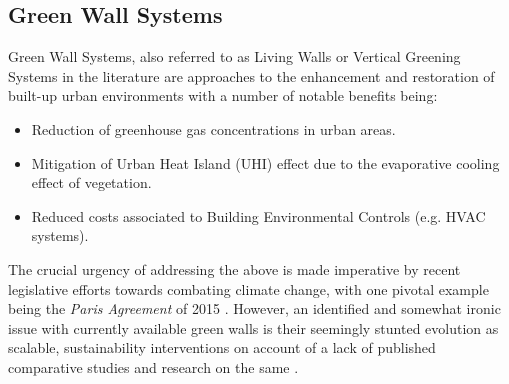 \documentclass{report}
\begin{document}
\subsection{Green Wall Systems}
Green Wall Systems, also referred to as Living Walls \cite{Sheweka2011} or Vertical Greening Systems \cite{Manso2015} in the literature are approaches to the enhancement and restoration of built-up urban environments with a number of notable benefits being:
\begin{itemize}
	\item Reduction of greenhouse gas concentrations in urban areas.
	\item Mitigation of Urban Heat Island (UHI) effect due to the evaporative cooling effect of vegetation.
	\item Reduced costs associated to Building Environmental Controls (e.g. HVAC systems).
\end{itemize}

The crucial urgency of addressing the above is made imperative by recent legislative efforts towards combating climate change, with one pivotal example being the \textit{Paris Agreement} of 2015 \cite{UNFCCC2015}. However, an identified and somewhat ironic issue with currently available green walls is their seemingly stunted evolution as scalable, sustainability interventions on account of a lack of published comparative studies and research on the same \cite{Manso2015} \cite{Kalantari2017}.
\end{document}
